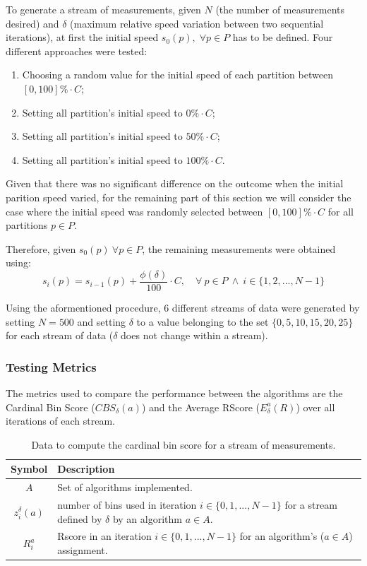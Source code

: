 To generate a stream of measurements, given $N$ (the number of measurements
desired) and $\delta$ (maximum relative speed variation between two sequential
iterations), at first the initial speed $s_0(p), \; \forall p \in P$ has to be
defined. Four different approaches were tested:
\begin{enumerate}
    \item Choosing a random value for the initial speed of each partition
        between $[0, 100]\% \cdot C$;
    \item Setting all partition's initial speed to $0\% \cdot C$;
    \item Setting all partition's initial speed to $50\% \cdot C$;
    \item Setting all partition's initial speed to $100\% \cdot C$.
\end{enumerate}

Given that there was no significant difference on the outcome when the initial
parition speed varied, for the remaining part of this section we will consider
the case where the initial speed was randomly selected between $[0, 100]\% \cdot
C$ for all partitions $p \in P$.

Therefore, given $s_0(p)\ \forall p \in P$, the remaining measurements were
obtained using: 
\begin{equation}
    s_i(p) = s_{i-1}(p) + \frac{\phi(\delta)}{100} \cdot C, \quad 
        \forall \ p \in P \ \wedge \ 
        i \in \{1, 2, ..., N-1\}
\end{equation}

Using the aformentioned procedure, 6 different streams of data were generated by
setting $N = 500$ and setting $\delta$ to a value belonging to the set
$\{0, 5, 10, 15, 20, 25\}$ for each stream of data ($\delta$ does not change
within a stream).

\subsubsection{Testing Metrics}

The metrics used to compare the performance between the algorithms are the
Cardinal Bin Score ($CBS_\delta(a)$) and the Average RScore ($E_\delta^a(R)$) over all iterations
of each stream.

\begin{table}[H] 
\centering 
\caption{Data to compute the cardinal bin score for a stream of measurements.} 
\label{table:bin_score} 
    \begin{tabular}{ |c|p{}| } 
    \hline 
    \textbf{Symbol} & \textbf{Description} \\ 
    \hline 
    $A$ & Set of algorithms implemented. \\ 
    $z_i^\delta(a)$ & number of bins used in iteration $i \in \{0, 1, ..., N-1\}$ for a
        stream defined by $\delta$ by an algorithm $a \in A$. \\ 
    $R_i^a$ & Rscore in an iteration $i \in \{0, 1, ..., N-1\}$ for an
        algorithm's ($a \in A$) assignment. \\ 
    \hline 
\end{tabular} 
\end{table}

